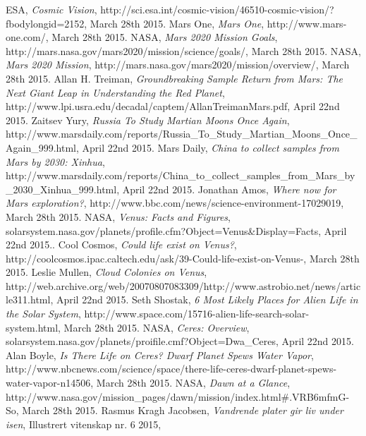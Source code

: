 \begin{thebibliography}{99}
		ESA,
		\emph{Cosmic Vision},
		http://sci.esa.int/cosmic-vision/46510-cosmic-vision/?fbodylongid=2152,
		March 28th 2015.
		Mars One,
		\emph{Mars One},
		http://www.mars-one.com/,
		March 28th 2015.
		NASA,
		\emph{Mars 2020 Mission Goals},
		http://mars.nasa.gov/mars2020/mission/science/goals/,
		March 28th 2015.
		NASA,
		\emph{Mars 2020 Mission},
		http://mars.nasa.gov/mars2020/mission/overview/,
		March 28th 2015.
		Allan H. Treiman,
		\emph{Groundbreaking Sample Return from Mars: The Next Giant Leap in Understanding the Red Planet},
		http://www.lpi.usra.edu/decadal/captem/AllanTreimanMars.pdf,
		April 22nd 2015.
		Zaitsev Yury,
		\emph{Russia To Study Martian Moons Once Again},
		http://www.marsdaily.com/reports/Russia\_To\_Study\_Martian\_Moons\_Once\_Again\_999.html,
		April 22nd 2015.
		Mars Daily,
		\emph{China to collect samples from Mars by 2030: Xinhua},
		http://www.marsdaily.com/reports/China\_to\_collect\_samples\_from\_Mars\_by\_2030\_Xinhua\_999.html,
		April 22nd 2015.
		Jonathan Amos,
		\emph{Where now for Mars exploration?},
		http://www.bbc.com/news/science-environment-17029019,
		March 28th 2015.
		NASA,
		\emph{Venus: Facts and Figures},
		solarsystem.nasa.gov/planets/profile.cfm?Object=Venus\&Display=Facts,
		April 22nd 2015..
		Cool Cosmos,
		\emph{Could life exist on Venus?},
		http://coolcosmos.ipac.caltech.edu/ask/39-Could-life-exist-on-Venus-,
		March 28th 2015.
		Leslie Mullen,
		\emph{Cloud Colonies on Venus},
		http://web.archive.org/web/20070807083309/http://www.astrobio.net/news/article311.html,
		April 22nd 2015.
		Seth Shostak,
		\emph{6 Most Likely Places for Alien Life in the Solar System},
		http://www.space.com/15716-alien-life-search-solar-system.html,
		March 28th 2015.
		NASA,
		\emph{Ceres: Overview},
		solarsystem.nasa.gov/planets/proifile.cmf?Object=Dwa\_Ceres,
		April 22nd 2015.
		Alan Boyle,
		\emph{Is There Life on Ceres? Dwarf Planet Spews Water Vapor},
		http://www.nbcnews.com/science/space/there-life-ceres-dwarf-planet-spews-water-vapor-n14506,
		March 28th 2015.
		NASA,
		\emph{Dawn at a Glance},
		http://www.nasa.gov/mission\_pages/dawn/mission/index.html\#.VRB6mfmG-So,
		March 28th 2015.
		Rasmus Kragh Jacobsen,
		\emph{Vandrende plater gir liv under isen},
		Illustrert vitenskap nr. 6 2015,

\end{thebibliography}
